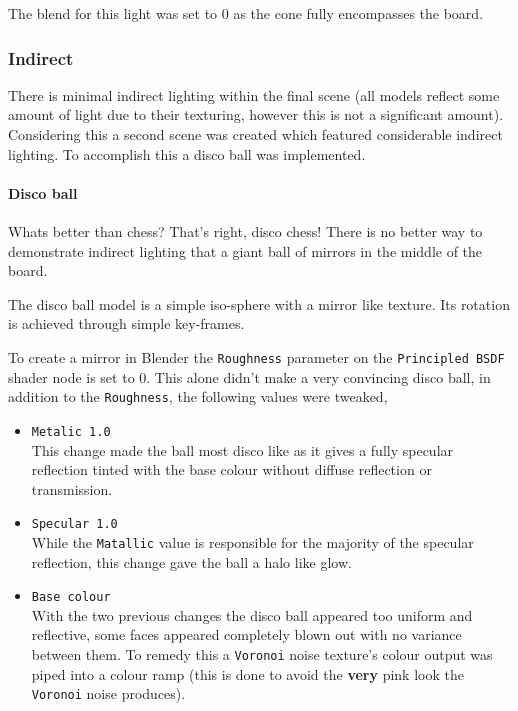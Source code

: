 \documentclass[11pt]{article}
\begin{document}
The blend for this light was set to 0 as the cone fully encompasses the board.
\subsubsection{Indirect}
\label{sec:org99f981f}
There is minimal indirect lighting within the final scene (all models
reflect some amount of light due to their texturing, however this is not a
significant amount). Considering this a second scene was created which featured
considerable indirect lighting. To accomplish this a disco ball was implemented.
\paragraph{Disco ball}
\label{sec:orgee3f3d9}
Whats better than chess? That's right, disco chess! There is no better way to
demonstrate indirect lighting that a giant ball of mirrors in the middle of the board.

The disco ball model is a simple iso-sphere with a mirror like texture. Its
rotation is achieved through simple key-frames.

To create a mirror in Blender the \texttt{Roughness} parameter on the \texttt{Principled BSDF}
shader node is set to 0. This alone didn't make a very convincing disco ball, in
addition to the \texttt{Roughness}, the following values were tweaked,
\begin{itemize}
\item \texttt{Metalic 1.0}\\
This change made the ball most disco like as it gives a fully specular
reflection tinted with the base colour without diffuse reflection or
transmission.
\item \texttt{Specular 1.0}\\
While the \texttt{Matallic} value is responsible for the majority of the specular
reflection, this change gave the ball a halo like glow.
\item \texttt{Base colour}\\
With the two previous changes the disco ball appeared too uniform and reflective, some
faces appeared completely blown out with no variance between them. To remedy
this a \texttt{Voronoi} noise texture's colour output was piped into a colour ramp
(this is done to avoid the \textbf{very} pink look  the \texttt{Voronoi} noise produces).
\end{itemize}
\end{document}
